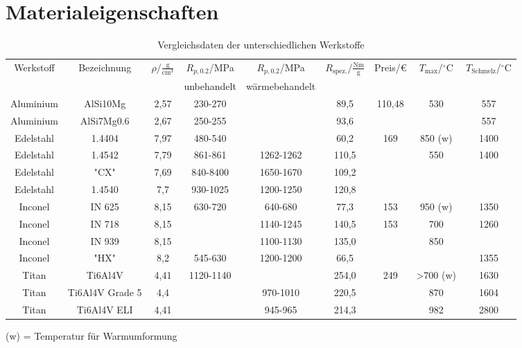\chapter{Materialeigenschaften}
\begin{landscape}
	\begin{table}[h]
	\centering
	\begin{tabular}{|c|c|c|c|c|c|c|c|c|}
		\hline
		Werkstoff&Bezeichnung&$\rho$/$\frac{\mathrm{g}}{\mathrm{cm}^3}$&$R_{p,0.2}$/MPa&$R_{p,0.2}$/MPa&$R_\mathrm{spez.}$/$\frac{\mathrm{Nm}}{\mathrm{g}}$&Preis/€&$T_\mathrm{max}$/$^\circ$C&$T_\mathrm{Schmelz}$/$^\circ$C\\
		&&&unbehandelt&wärmebehandelt&&&&\\
		\hline \hline
		Aluminium&AlSi10Mg&2,57&230-270&&89,5&110,48&530&557\\
		Aluminium&AlSi7Mg0.6&2,67&250-255&&93,6&&&557\\
		\hline
		Edelstahl&1.4404&7,97&480-540&&60,2&169&850 (w)&1400\\
		Edelstahl&1.4542&7,79&861-861&1262-1262&110,5&&550&1400\\
		Edelstahl&"CX"&7,69&840-8400&1650-1670&109,2&&&\\
		Edelstahl&1.4540&7,7&930-1025&1200-1250&120,8&&&\\
		\hline
		Inconel&IN 625&8,15&630-720&640-680&77,3&153&950 (w)&1350\\
		Inconel&IN 718&8,15&&1140-1245&140,5&153&700&1260\\
		Inconel&IN 939&8,15&&1100-1130&135,0&&850&\\
		Inconel&"HX"&8,2&545-630&1200-1200&66,5&&&1355\\
		\hline
		Titan&Ti6Al4V&4,41&1120-1140&&254,0&249&>700 (w)&1630\\
		Titan&Ti6Al4V Grade 5&4,4&&970-1010&220,5&&870&1604\\
		Titan&Ti6Al4V ELI&4,41&&945-965&214,3&&982&2800\\
		\hline
	\end{tabular}
	\begin{flushright}
	\end{flushright}
	\caption{Vergleichsdaten der unterschiedlichen Werkstoffe}
	\label{tab_Werkstoffe} 
\end{table}
(w) = Temperatur für Warmumformung
\end{landscape}